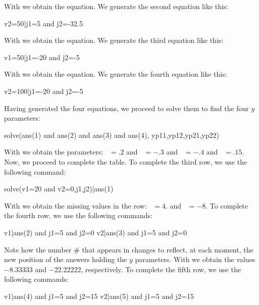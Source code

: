 With  we obtain the equation. We generate the second
equation like this:

\begin{entry}
v2=50|j1=5 and j2=-32.5
\end{entry}

With  we obtain the equation. We generate the third
equation like this:

\begin{entry}
v1=50|j1=-20 and j2=-5
\end{entry}

With  we obtain the equation. We generate the fourth
equation like this:

\begin{entry}
v2=100|j1=-20 and j2=-5
\end{entry}

Having generated the four equations, we proceed to solve them to
find the four $y$ parameters:

\begin{entry}
solve(ans(1) and ans(2) and ans(3) and ans(4),
      {yp11,yp12,yp21,yp22})
\end{entry}

With  we obtain the parameters: ~$= .2$ and
~$= -.3$ and ~$= -.4$ and
~$= .15$. Now, we proceed to complete the table. To
complete the third row, we use the following command:

\begin{entry}
solve(v1=20 and v2=0,{j1,j2})|ans(1)
\end{entry}

With  we obtain the missing values in the row:
~$= 4.$ and ~$= -8.$ To complete the fourth row,
we use the following commands:

\begin{entry}
v1|ans(2) and j1=5 and j2=0
v2|ans(3) and j1=5 and j2=0
\end{entry}

Note how the number \# that appears in  changes to
reflect, at each moment, the new position of the answers holding the
$y$ parameters. With  we obtain the values $-8.33333$ and
$-22.22222$, respectively. To complete the fifth row, we use the
following commands:

\begin{entry}
v1|ans(4) and j1=5 and j2=15
v2|ans(5) and j1=5 and j2=15
\end{entry}

